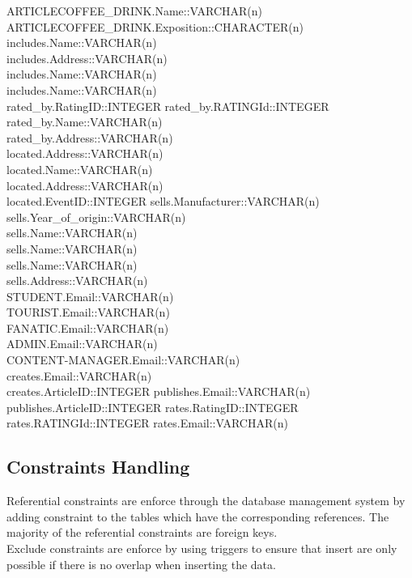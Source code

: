 ARTICLECOFFEE\_DRINK.Name::VARCHAR(n)\\
ARTICLECOFFEE\_DRINK.Exposition::CHARACTER(n)\\
includes.Name::VARCHAR(n)\\
includes.Address::VARCHAR(n)\\
includes.Name::VARCHAR(n)\\
includes.Name::VARCHAR(n)\\
rated\_by.RatingID::INTEGER
rated\_by.RATINGId::INTEGER
rated\_by.Name::VARCHAR(n)\\
rated\_by.Address::VARCHAR(n)\\
located.Address::VARCHAR(n)\\
located.Name::VARCHAR(n)\\
located.Address::VARCHAR(n)\\
located.EventID::INTEGER
sells.Manufacturer::VARCHAR(n)\\
sells.Year\_of\_origin::VARCHAR(n)\\
sells.Name::VARCHAR(n)\\
sells.Name::VARCHAR(n)\\
sells.Name::VARCHAR(n)\\
sells.Address::VARCHAR(n)\\
STUDENT.Email::VARCHAR(n)\\
TOURIST.Email::VARCHAR(n)\\
FANATIC.Email::VARCHAR(n)\\
ADMIN.Email::VARCHAR(n)\\
CONTENT-MANAGER.Email::VARCHAR(n)\\
creates.Email::VARCHAR(n)\\
creates.ArticleID::INTEGER
publishes.Email::VARCHAR(n)\\
publishes.ArticleID::INTEGER
rates.RatingID::INTEGER
rates.RATINGId::INTEGER
rates.Email::VARCHAR(n)\\
\subsection{Constraints Handling}
Referential constraints are enforce through the database management system by adding constraint to the tables which have the corresponding references. The majority of the referential constraints are foreign keys.\\
Exclude constraints are enforce  by using triggers to ensure that insert are only possible if there is no overlap when inserting the data.\\

\newpage